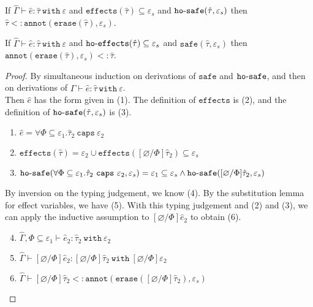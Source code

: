 \documentclass{llncs}
\newcommand{\keywadj}[1]{\mathtt{#1}}
\newcommand{\keyw}[1]{\keywadj{#1}~}
\newcommand{\kw}[1]{\keyw{ #1 }}
\newcommand{\kwa}[1]{\keywadj{ #1 }}
\newcommand{\hyphen}{\hbox{-}}
\newcommand{\fx}[1]{ \kwa{effects}(#1) }
\newcommand{\hofx}[1]{ \kwa{ho \hyphen effects}(#1) }
\newcommand{\safe}[2]{ \kwa{safe}(#1, #2) }
\newcommand{\hosafe}[2]{ \kwa{ho \hyphen safe}(#1, #2) }
\newcommand{\annot}[2]{
	\keywadj{annot}(#1, #2)
}
\newcommand{\erase}[1]{
	\keywadj{erase}(#1)
}
\begin{document}
\hrulefill

\begin{lemma}[Approximation 1]
If $\hat \Gamma \vdash \hat e: \hat \tau~\kw{with} \varepsilon$ and $\fx{\hat \tau} \subseteq \varepsilon_s$ and $\hosafe{\hat \tau}{\varepsilon_s}$ then $\hat \tau <: \annot{\erase{\hat \tau}}{\varepsilon_s}$.
\end{lemma}

\begin{lemma}[Approximation 2]
If $\hat \Gamma \vdash \hat e: \hat \tau~\kw{with} \varepsilon$ and $\hofx{\hat \tau} \subseteq \varepsilon_s$ and $\safe{\hat \tau}{\varepsilon_s}$ then $\annot{\erase{\hat \tau}}{\varepsilon_s} <: \hat \tau$.
\end{lemma}

\begin{proof} By simultaneous induction on derivations of $\kwa{safe}$ and $\kwa{ho \hyphen safe}$, and then on derivations of $\hat \Gamma \vdash \hat e: \hat \tau~\kw{with} \varepsilon$.\\

 Then $\hat e$ has the form given in (1). The definition of $\kwa{effects}$ is (2), and the definition of $\hosafe{\hat \tau}{\varepsilon_s}$ is (3). 

\begin{enumerate}
	\item $\hat e = \forall \Phi \subseteq \varepsilon_1. \hat \tau_2~\kw{caps} \varepsilon_2$
	\item $\fx{\hat \tau} = \varepsilon_2 \cup \fx{[\varnothing/\Phi]\hat \tau_2} \subseteq \varepsilon_s$
	\item $\hosafe{\forall \Phi \subseteq \varepsilon_1. \hat \tau_2~\kw{caps} \varepsilon_2}{\varepsilon_s} = \varepsilon_1 \subseteq \varepsilon_s \land \hosafe{[\varnothing/\Phi]\hat \tau_2}{\varepsilon_s}$
\end{enumerate} 

By inversion on the typing judgement, we know (4). By the substitution lemma for effect variables, we have (5). With this typing judgement and (2) and (3), we can apply the inductive assumption to $[\varnothing/\Phi]\hat e_2$ to obtain (6).

\begin{enumerate}
	\setcounter{enumi}{3}
	\item $\hat \Gamma, \Phi \subseteq \varepsilon_1 \vdash \hat e_2: \hat \tau_2~\kw{with} \varepsilon_2$
	\item $\hat \Gamma \vdash [\varnothing/\Phi]\hat e_2: [\varnothing/\Phi]\hat \tau_2~\kw{with} [\varnothing/\Phi]\varepsilon_2$
	\item $\hat \Gamma \vdash [\varnothing/\Phi]\hat \tau_2 <: \annot{\erase{[\varnothing/\Phi]\hat \tau_2}}{\varepsilon_s}$
\end{enumerate}


\end{proof}
\end{document}
